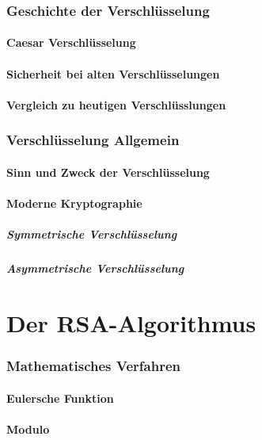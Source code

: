 \documentclass[12pt,a4paper,german]{article}
\begin{document}
\section{Geschichte der Verschlüsselung}
\subsection{Caesar Verschlüsselung}
\subsection{Sicherheit bei alten Verschlüsselungen}
\subsection{Vergleich zu heutigen Verschlüsslungen}

\section{Verschlüsselung Allgemein}
\subsection{Sinn und Zweck der Verschlüsselung}
\subsection{Moderne Kryptographie}
\subsubsection{Symmetrische Verschlüsselung}
\subsubsection{Asymmetrische Verschlüsselung}

\newpage
\part{Der RSA-Algorithmus}
\section{Mathematisches Verfahren}
\subsection{Eulersche Funktion}
\subsection{Modulo}
\end{document}
